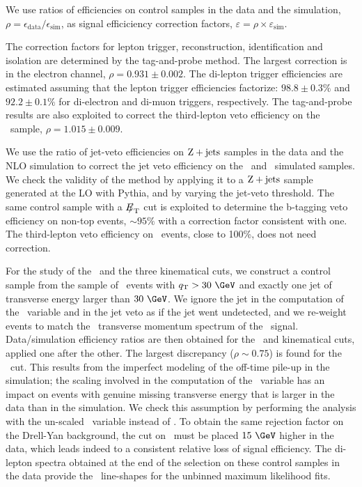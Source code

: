 We use ratios of efficiencies on control samples in the data and the simulation, $\rho = \epsilon_{\mathrm{data}}/\epsilon_{\mathrm{sim}}$, as signal efficiciency correction factors, $\varepsilon = \rho \times \varepsilon_{\mathrm{sim}}$. 

The correction factors for lepton trigger, reconstruction, identification and isolation are determined by the tag-and-probe method. The largest correction is in the electron channel, $\rho=0.931\pm0.002$.  The di-lepton trigger efficiencies are estimated assuming that the lepton trigger efficiencies factorize: $98.8\pm0.3\%$ and $92.2\pm0.1\%$ for di-electron and di-muon triggers, respectively.  The tag-and-probe results are also exploited to correct the third-lepton veto efficiency on the \WZ\ sample, $\rho=1.015\pm0.009$. 

We use the ratio of jet-veto efficiencies on $\mathrm{Z}+\mathrm{jets}$ samples in the data and the NLO simulation to correct the jet veto efficiency on the \ZZ\ and \WZ\ simulated samples. We check the validity of the method by applying it to a $\mathrm{Z}+\mathrm{jets}$ sample generated at the LO with Pythia, and by varying the jet-veto threshold. The same control sample with a ${E\!\!\!/}_{\mathrm{T}}$ cut is exploited to determine the b-tagging veto efficiency on non-top events, $\sim95\%$ with a correction factor consistent with one. The third-lepton veto efficiency on \ZZ\ events, close to 100\%, does not need correction.  

For the study of the \CORRMET\ and the three kinematical cuts, we construct a control sample from the sample of \PZ\ events with $\QT>30~\GeV$ and exactly one jet of transverse energy larger than $30~\GeV$. 
We ignore the jet in the computation of the \PUMET\ variable and in the jet veto as if the jet went undetected, and we re-weight events to match the \PZ\ transverse momentum spectrum of the \ZZ\ signal.  
Data/simulation efficiency ratios are then obtained for the \CORRMET\ and kinematical cuts, 
applied one after the other. 
The largest discrepancy ($\rho\sim0.75$) is found for the \CORRMET\ cut. This results from the imperfect modeling of the off-time pile-up in the simulation; the scaling involved in the computation of the \CORRMET\ variable has an impact on events with genuine missing transverse energy that is larger in the data than in the simulation. We check this assumption by performing the analysis with the un-scaled \PUMETMIN\ variable instead of \CORRMET. To obtain the same rejection factor on the Drell-Yan background,  the cut on \PUMETMIN\ must be placed $15~\GeV$ higher in the data, which leads indeed to a consistent relative loss of signal efficiency.   The di-lepton spectra obtained at the end of the selection on these control samples in the data provide the \PZ\ line-shapes for the unbinned maximum likelihood fits.   

